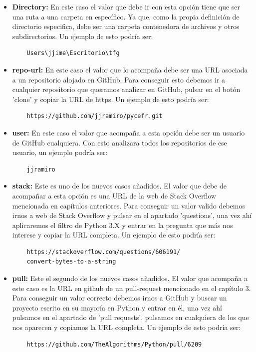 \documentclass[a4paper, 12pt]{book}
\begin{document}
\begin{itemize}
	\item \textbf{Directory:} En este caso el valor que debe ir con esta opción tiene que ser una ruta a una carpeta en específico. Ya que, como la propia definición de directorio especifica, debe ser una carpeta contenedora de archivos y otros subdirectorios. Un ejemplo de esto podría ser:
	\begin{verbatim}
	Users\jjime\Escritorio\tfg
	\end{verbatim}
	\item \textbf{repo-url:} En este caso el valor que lo acompaña debe ser una URL asociada a un repositorio alojado en GitHub. Para conseguir esto debemos ir a cualquier repositorio que queramos analizar en GitHub, pulsar en el botón 'clone' y copiar la URL de https. Un ejemplo de esto podría ser:
	\begin{verbatim}
	https://github.com/jjramiro/pycefr.git
	\end{verbatim}
	\item \textbf{user:} En este caso el valor que acompaña a esta opción debe ser un usuario de GitHub cualquiera. Con esto analizara todos los repositorios de ese usuario, un ejemplo podría ser:
	\begin{verbatim}
	jjramiro
	\end{verbatim}
	\item \textbf{stack:} Este es uno de los nuevos casos añadidos. El valor que debe de acompañar a esta opción es una URL de la web de Stack Overflow mencionada en capítulos anteriores. Para conseguir un valor valido debemos irnos a web de Stack Overflow y pulsar en el apartado 'questions', una vez ahí aplicaremos el filtro de Python 3.X y entrar en la pregunta que más nos interese y copiar la URL completa. Un ejemplo de esto podría ser:
	\begin{verbatim}
	https://stackoverflow.com/questions/606191/
	convert-bytes-to-a-string
	\end{verbatim}
	\item \textbf{pull:} Este el segundo de los nuevos  casos añadidos. El valor que acompaña a este caso es la URL en github de un pull-request mencionado en el capítulo 3. Para conseguir un valor correcto debemos irnos a GitHub y buscar un proyecto escrito en su mayoría en Python y entrar en él, una vez ahí pulsamos en el apartado de 'pull requests', pulsamos en cualquiera de los que nos aparecen y copiamos la URL completa. Un ejemplo de esto podría ser:
	\begin{verbatim}
	https://github.com/TheAlgorithms/Python/pull/6209
	\end{verbatim}
\end{itemize}
\end{document}
